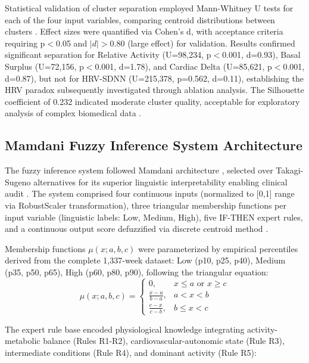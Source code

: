 Statistical validation of cluster separation employed Mann-Whitney U tests for each of the four input variables, comparing centroid distributions between clusters \cite{Mann1947}. Effect sizes were quantified via Cohen's d, with acceptance criteria requiring p$<$0.05 and $|d| > 0.80$ (large effect) for validation. Results confirmed significant separation for Relative Activity (U=98,234, p$<$0.001, d=0.93), Basal Surplus (U=72,156, p$<$0.001, d=1.78), and Cardiac Delta (U=85,621, p$<$0.001, d=0.87), but not for HRV-SDNN (U=215,378, p=0.562, d=0.11), establishing the HRV paradox subsequently investigated through ablation analysis. The Silhouette coefficient of 0.232 indicated moderate cluster quality, acceptable for exploratory analysis of complex biomedical data \cite{Kaufman2005}.

\subsection{Mamdani Fuzzy Inference System Architecture}
\label{subsec:fuzzy_system}

The fuzzy inference system followed Mamdani architecture \cite{Mamdani1974}, selected over Takagi-Sugeno alternatives for its superior linguistic interpretability enabling clinical audit \cite{Czmil2023FuzzyClassifiers}. The system comprised four continuous inputs (normalized to [0,1] range via RobustScaler transformation), three triangular membership functions per input variable (linguistic labels: Low, Medium, High), five IF-THEN expert rules, and a continuous output score defuzzified via discrete centroid method \cite{Ross2010}.

Membership functions $\mu(x; a, b, c)$ were parameterized by empirical percentiles derived from the complete 1,337-week dataset: Low (p10, p25, p40), Medium (p35, p50, p65), High (p60, p80, p90), following the triangular equation:
\begin{equation}
\mu(x; a, b, c) = 
\begin{cases}
0, & x \leq a \text{ or } x \geq c \\
\frac{x-a}{b-a}, & a < x < b \\
\frac{c-x}{c-b}, & b \leq x < c
\end{cases}
\label{eq:membership}
\end{equation}

The expert rule base encoded physiological knowledge integrating activity-metabolic balance (Rules R1-R2), cardiovascular-autonomic state (Rule R3), intermediate conditions (Rule R4), and dominant activity (Rule R5):

